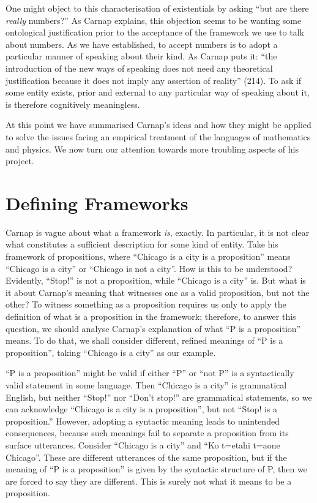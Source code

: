 \documentclass[12pt]{article}
\begin{document}
One might object to this characterisation of existentials by asking ``but are there \textit{really} numbers?'' As Carnap explains, this objection seems to be wanting some ontological justification prior to the acceptance of the framework we use to talk about numbers. As we have established, to accept numbers is to adopt a particular manner of speaking about their kind. As Carnap puts it: ``the introduction of the new ways of speaking does not need any theoretical justification because it does not imply any assertion of reality'' (214). To ask if some entity exists, prior and external to any particular way of speaking about it, is therefore cognitively meaningless.

At this point we have summarised Carnap's ideas and how they might be applied to solve the issues facing an empirical treatment of the languages of mathematics and physics. We now turn our attention towards more troubling aspects of his project.

\section{Defining Frameworks}

Carnap is vague about what a framework \textit{is}, exactly. In particular, it is not clear what constitutes a sufficient description for some kind of entity. Take his framework of propositions, where ``Chicago is a city is a proposition'' means ``Chicago is a city'' or ``Chicago is not a city''. How is this to be understood? Evidently, ``Stop!'' is not a proposition, while ``Chicago is a city'' is. But what is it about Carnap's meaning that witnesses one as a valid proposition, but not the other? To witness something as a proposition requires us only to apply the definition of what is a proposition in the framework; therefore, to answer this question, we should analyse Carnap's explanation of what ``P is a proposition'' means. To do that, we shall consider different, refined meanings of ``P is a proposition'', taking ``Chicago is a city'' as our example.

``P is a proposition'' might be valid if either ``P'' or ``not P'' is a syntactically valid statement in some language. Then ``Chicago is a city'' is grammatical English, but neither ``Stop!'' nor ``Don't stop!'' are grammatical statements, so we can acknowledge ``Chicago is a city is a proposition'', but not ``Stop! is a proposition.'' However, adopting a syntactic meaning leads to unintended consequences, because such meanings fail to separate a proposition from its surface utterances. Consider ``Chicago is a city'' and ``Ko t\a=etahi t\a=aone Chicago''. These are different utterances of the same proposition, but if the meaning of ``P is a proposition'' is given by the syntactic structure of P, then we are forced to say they are different. This is surely not what it means to be a proposition. 
\end{document}
